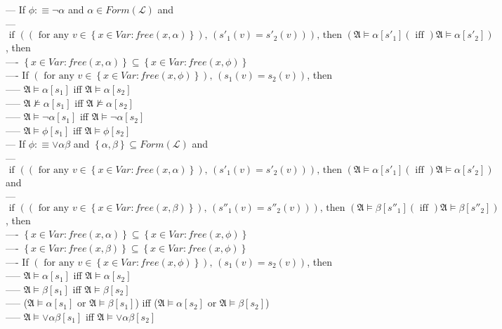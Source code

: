 \documentclass{book}
\newcommand{\is}{:\equiv}
\newcommand{\inot}{\not}
\newcommand{\txtiff}{\left(\text{ iff }\right)}
\newcommand{\txtforall}[2]{\left(\text{ for any }#1\right)\text{, }\left(#2\right)}
\newcommand{\txtif}[2]{\text{ if }\left(#1\right)\text{, then }\left(#2\right)}
\newcommand{\free}[2]{free(#1, #2)}
\newcommand{\set}[1]{\left\{ #1 \right\}}
\begin{document}
			--- If $\phi \is \lnot \alpha$ and $\alpha \in Form(\mathcal{L})$ and \\
			--- $\txtif{\txtforall{v \in \set{x \in Var: \free{x}{\alpha}}}{s'_1(v) = s'_2(v)}}{\mathfrak{A} \vDash \alpha[s'_1] \txtiff \mathfrak{A} \vDash \alpha[s'_2]}$, then \\
				---- $\set{x \in Var: \free{x}{\alpha}} \subseteq \set{x \in Var: \free{x}{\phi}}$ \\
				---- If $\txtforall{v \in \set{x \in Var: \free{x}{\phi}}}{s_1(v) = s_2(v)}$, then \\
					----- $\mathfrak{A} \vDash \alpha[s_1]$ iff $\mathfrak{A} \vDash \alpha[s_2]$ \\
					----- $\mathfrak{A} \inot \vDash \alpha[s_1]$ iff $\mathfrak{A} \inot \vDash \alpha[s_2]$ \\
					----- $\mathfrak{A} \vDash \lnot \alpha[s_1]$ iff $\mathfrak{A} \vDash \lnot \alpha[s_2]$ \\
					----- $\mathfrak{A} \vDash \phi[s_1]$ iff $\mathfrak{A} \vDash \phi[s_2]$ \\
			--- If $\phi \is \lor \alpha \beta$ and $\set{\alpha, \beta} \subseteq Form(\mathcal{L})$ and \\
			--- $\txtif{\txtforall{v \in \set{x \in Var: \free{x}{\alpha}}}{s'_1(v) = s'_2(v)}}{\mathfrak{A} \vDash \alpha[s'_1] \txtiff \mathfrak{A} \vDash \alpha[s'_2]}$ and \\
			--- $\txtif{\txtforall{v \in \set{x \in Var: \free{x}{\beta}}}{s''_1(v) = s''_2(v)}}{\mathfrak{A} \vDash \beta[s''_1] \txtiff \mathfrak{A} \vDash \beta[s''_2]}$, then \\
				---- $\set{x \in Var: \free{x}{\alpha}} \subseteq \set{x \in Var: \free{x}{\phi}}$ \\
				---- $\set{x \in Var: \free{x}{\beta}} \subseteq \set{x \in Var: \free{x}{\phi}}$ \\
				---- If $\txtforall{v \in \set{x \in Var: \free{x}{\phi}}}{s_1(v) = s_2(v)}$, then \\
					----- $\mathfrak{A} \vDash \alpha[s_1]$ iff $\mathfrak{A} \vDash \alpha[s_2]$ \\
					----- $\mathfrak{A} \vDash \beta[s_1]$ iff $\mathfrak{A} \vDash \beta[s_2]$ \\
					----- ($\mathfrak{A} \vDash \alpha[s_1]$ or $\mathfrak{A} \vDash \beta[s_1]$) iff ($\mathfrak{A} \vDash \alpha[s_2]$ or $\mathfrak{A} \vDash \beta[s_2]$) \\
					----- $\mathfrak{A} \vDash \lor \alpha \beta[s_1]$ iff $\mathfrak{A} \vDash \lor \alpha \beta[s_2]$ \\
\end{document}
